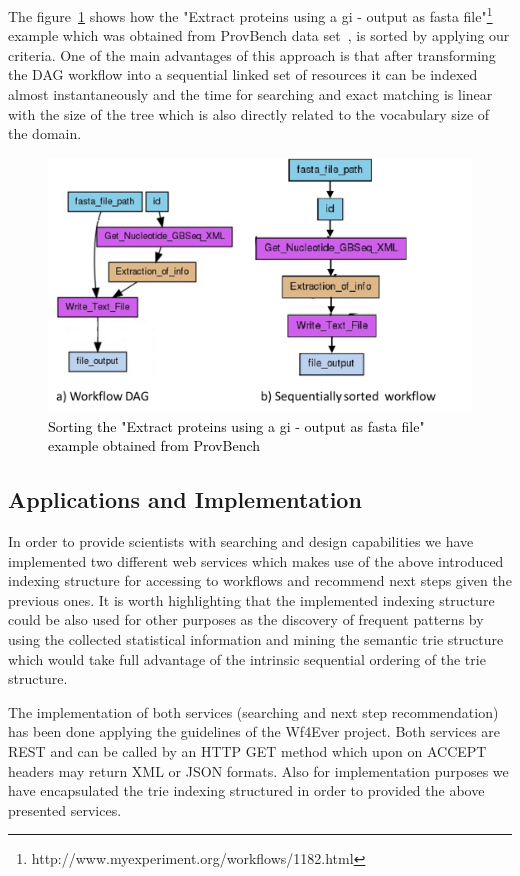 The figure~\ref{fig:sorting-workflow} shows how the "Extract proteins using a gi - output as fasta file"\footnote{http://www.myexperiment.org/workflows/1182.html} example which was obtained from ProvBench data set~\cite{khalid_13}, is sorted by applying our criteria. One of the main advantages of this approach is that after transforming the DAG workflow into a sequential linked set of resources it can be indexed almost instantaneously and the time for searching and exact matching is linear with the size of the tree which is also directly related to the vocabulary size of the domain.

\begin{figure}[ht!]
\centering
\includegraphics[scale=0.70]{Figures/sorting-workflow.png}
\caption{\textcolor{black}{Sorting the "Extract proteins using a gi - output as fasta file" example obtained from ProvBench}}
\label{fig:sorting-workflow}
\end{figure}

\subsection{Applications and Implementation}
In order to provide scientists with searching and design capabilities we have implemented two different web services which makes use of the above introduced indexing structure for accessing to workflows and recommend next steps given the previous ones. It is worth highlighting that the implemented indexing structure could be also used for other purposes as the discovery of frequent patterns by using the collected statistical information and mining the semantic trie structure which would take full advantage of the intrinsic sequential ordering of the trie structure. 

The implementation of both services (searching and next step recommendation) has been done applying the guidelines of the Wf4Ever project. Both services are REST and can be called by an HTTP GET method which upon on ACCEPT headers may return XML or JSON formats. Also for implementation purposes we have encapsulated the trie indexing structured in order to provided the above presented services.
 
